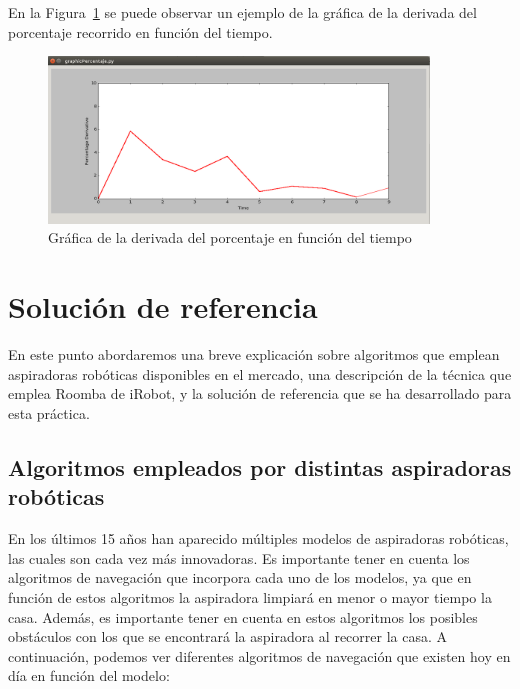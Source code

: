 En la Figura~\ref{fig.grafica_percentaje2} se puede observar un ejemplo de la gráfica de la derivada del porcentaje recorrido en función del tiempo.\\

\begin{figure}[H]
  \begin{center}
    \includegraphics[width=0.9\textwidth]{figures/Vacuum/Grafica_percentaje2.png}
		\caption{Gráfica de la derivada del porcentaje en función del tiempo}
		\label{fig.grafica_percentaje2}
		\end{center}
\end{figure}

\section{Solución de referencia}
En este punto abordaremos una breve explicación sobre algoritmos que emplean aspiradoras robóticas disponibles en el mercado, una descripción de la técnica que emplea Roomba de iRobot, y la solución de referencia que se ha desarrollado para esta práctica. 


\subsection{Algoritmos empleados por distintas aspiradoras robóticas}
En los últimos 15 años han aparecido múltiples modelos de aspiradoras robóticas, las cuales son cada vez más innovadoras. Es importante tener en cuenta los algoritmos de navegación que incorpora cada uno de los modelos, ya que en función de estos algoritmos la aspiradora limpiará en menor o mayor tiempo la casa. Además, es importante tener en cuenta en estos algoritmos los posibles obstáculos con los que se encontrará la aspiradora al recorrer la casa. A continuación, podemos ver diferentes algoritmos de navegación que existen hoy en día en función del modelo:

